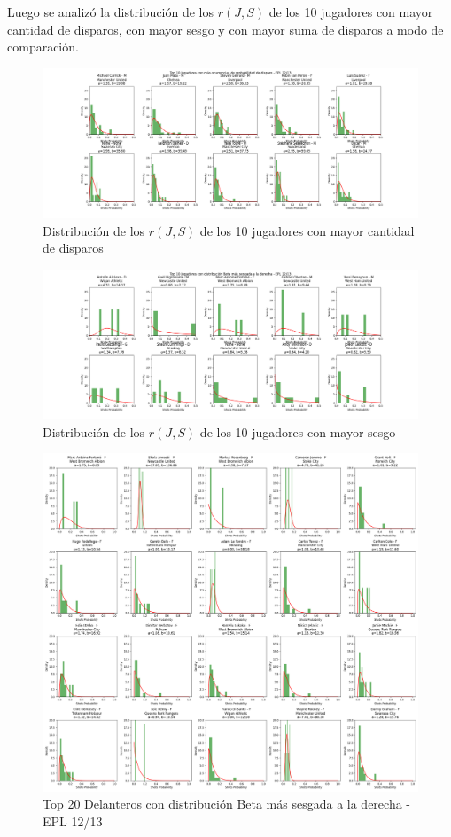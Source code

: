 \documentclass[
  a4paper,
]{article}
\begin{document}
Luego se analizó la distribución de los \(r(J, S)\) de los 10 jugadores
con mayor cantidad de disparos, con mayor sesgo y con mayor suma de
disparos a modo de comparación.

\begin{figure}
  \includegraphics{recursos_pdf/graficos/Top_10_by_counts_players_shots_prob_beta_binomial.png}
    \caption{Distribución de los $r(J, S)$ de los 10 jugadores con mayor cantidad de disparos}
\end{figure}

\begin{figure}
  \includegraphics{recursos_pdf/graficos/Top_10_by_skew_players_shots_prob_beta_binomial.png}
    \caption{Distribución de los $r(J, S)$ de los 10 jugadores con mayor sesgo}
\end{figure}

\begin{figure}
  \includegraphics{recursos_pdf/graficos/Top_20_Forwards_by_skew_players_shots_prob_beta_binomial.png}
    \caption{Top 20 Delanteros con distribución Beta más sesgada a la derecha - EPL 12/13}
\end{figure}
\end{document}
